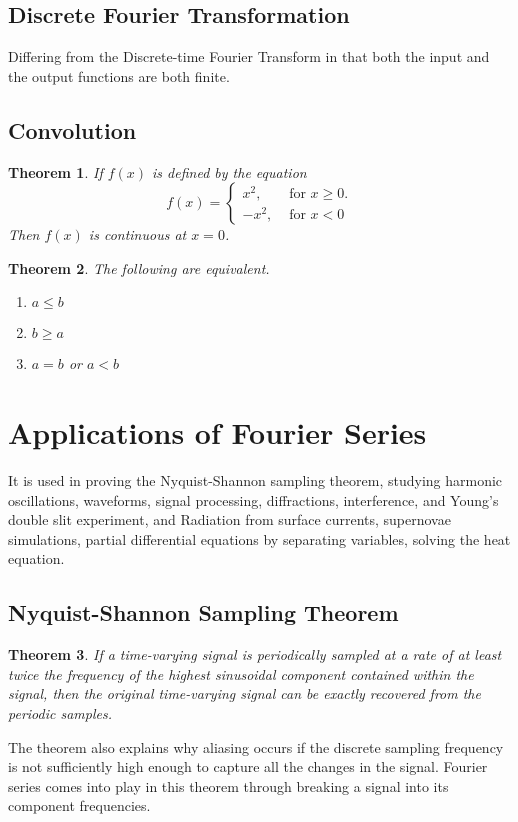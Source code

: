 \documentclass{article}
\newtheorem{theorem}{Theorem}
\begin{document}
\subsection{Discrete Fourier Transformation}
Differing from the Discrete-time Fourier Transform in that both the input and the output functions are both finite.
\subsection{Convolution}

\begin{theorem}\label{ContThrm}
    If $f(x)$ is defined by the equation
    \begin{equation}\label{SplitFunc}
         f(x) = \left\{ \begin{array}{rl}
                          x^{2}, & \mbox{~for $x \geq 0$.} \\
                         -x^{2}, & \mbox{~for $x < 0$}
                         \end{array} \right.
   \end{equation}
   Then $f(x)$ is continuous at $x=0$.
\end{theorem}

\begin{theorem}
   The following are equivalent.
   \begin{enumerate}
      \item $a \leq b$
      \item $b \geq a$
      \item $a = b$ or $a<b$
   \end{enumerate}
\end{theorem}

\section{Applications of Fourier Series}
It is used in proving the Nyquist-Shannon sampling theorem,
studying harmonic oscillations, waveforms, signal processing,
diffractions, interference, and Young's double slit experiment,
and Radiation from surface currents, supernovae simulations,
partial differential equations by separating variables,
solving the heat equation.

\subsection{Nyquist-Shannon Sampling Theorem}
\begin{theorem}
	If a time-varying signal is periodically sampled at a rate of at least twice the frequency of the highest sinusoidal component contained within the signal, then the original time-varying signal can be exactly recovered from the periodic samples.
\end{theorem}
The theorem also explains why aliasing occurs if the discrete sampling frequency is not sufficiently high enough to capture all the changes in the signal. 
Fourier series comes into play in this theorem through breaking a signal into its component frequencies.
\end{document}
